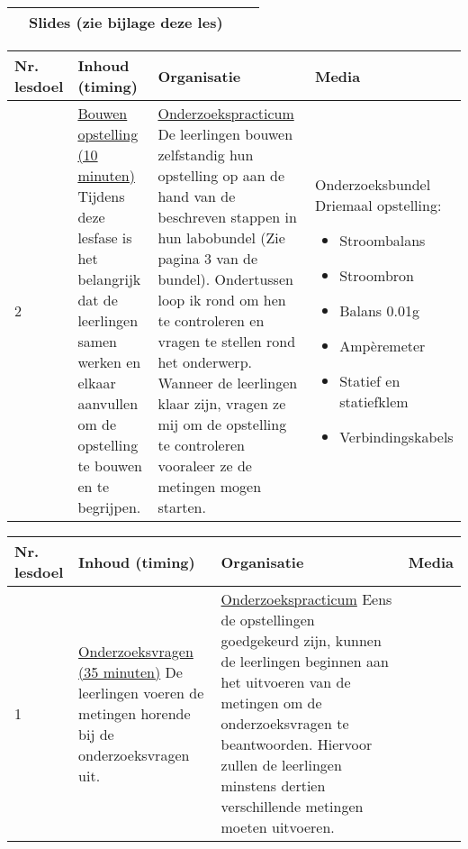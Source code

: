 \begin{landscape}
\begin{tabularx}{1.56\textwidth}{|p{1.5cm}|p{7cm}|X|p{4cm}|}
	
	& Slides (zie bijlage deze les) 
	\\ \hline
\end{tabularx}



\begin{tabularx}{1.56\textwidth}{|p{1.5cm}|p{7cm}|X|p{5cm}|}
	\hline
	\textbf{Nr. lesdoel } & \textbf{Inhoud (timing)}  & \textbf{Organisatie } & \textbf{Media } \\ \hline
	2&\underline{Bouwen opstelling (10 minuten)}\newline
 		Tijdens deze lesfase is het belangrijk dat de leerlingen samen werken en elkaar aanvullen om de opstelling te bouwen en te begrijpen. 
	&  \underline{Onderzoekspracticum}\newline 
	De leerlingen bouwen zelfstandig hun opstelling op aan de hand van de beschreven stappen in hun labobundel (Zie pagina 3 van de bundel). Ondertussen loop ik rond om hen te controleren en vragen te stellen rond het onderwerp. Wanneer de leerlingen klaar zijn, vragen ze mij om de opstelling te controleren vooraleer ze de metingen mogen starten.
	& Onderzoeksbundel \newline\newline Driemaal opstelling:
	\begin{itemize}
		\item Stroombalans
		\item  Stroombron
		\item Balans 0.01g
		\item Ampèremeter
		\item Statief en statiefklem
		\item Verbindingskabels
	\end{itemize}
	\\ \hline
\end{tabularx}



\begin{tabularx}{1.56\textwidth}{|p{1.5cm}|p{7cm}|X|p{5cm}|}
	\hline
	\textbf{Nr. lesdoel } & \textbf{Inhoud (timing)}  & \textbf{Organisatie } & \textbf{Media } \\ \hline
	1\newline\newline 3\newline\newline 4\newline\newline 5&\underline{Onderzoeksvragen (35 minuten)}\newline
		De leerlingen voeren de metingen horende bij de onderzoeksvragen uit.
	&  \underline{Onderzoekspracticum}\newline 
	Eens de opstellingen goedgekeurd zijn, kunnen de leerlingen beginnen aan het uitvoeren van de metingen om de onderzoeksvragen te beantwoorden. Hiervoor zullen de leerlingen minstens dertien verschillende metingen moeten uitvoeren. 
	

\end{tabularx}
\end{landscape}
